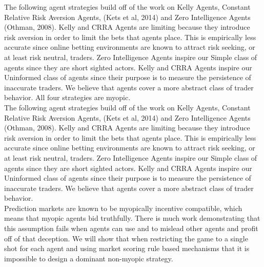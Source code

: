 The following agent strategies build off of the work on Kelly Agents, Constant Relative Risk Aversion Agents, (Kets et al, 2014) and Zero Intelligence Agents (Othman, 2008). Kelly and CRRA Agents are limiting because they introduce risk aversion in order to limit the bets that agents place. This is empirically less accurate since online betting environments are known to attract risk seeking, or at least risk neutral, traders. Zero Intelligence Agents inspire our Simple class of agents since they are short sighted actors. Kelly and CRRA Agents inspire our Uninformed class of agents since their purpose is to measure the persistence of inaccurate traders. We believe that  agents cover a more abstract class of trader behavior. All four strategies are myopic.\\

The following agent strategies build off of the work on Kelly Agents, Constant Relative Risk Aversion Agents, (Kets et al, 2014) and Zero Intelligence Agents (Othman, 2008). Kelly and CRRA Agents are limiting because they introduce risk aversion in order to limit the bets that agents place. This is empirically less accurate since online betting environments are known to attract risk seeking, or at least risk neutral, traders. Zero Intelligence Agents inspire our Simple class of agents since they are short sighted actors. Kelly and CRRA Agents inspire our Uninformed class of agents since their purpose is to measure the persistence of inaccurate traders. We believe that  agents cover a more abstract class of trader behavior.\\

Prediction markets are known to be myopically incentive compatible, which means that myopic agents bid truthfully. There is much work demonstrating that this assumption fails when agents can use  and  to mislead other agents and profit off of that deception. We will show that when restricting the game to a single shot for each agent and using market scoring rule based mechanisms that it is impossible to design a dominant non-myopic strategy.\\


